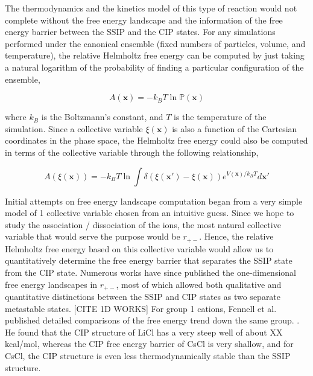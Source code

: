\begin{spacing}{2.0}
    The thermodynamics and the kinetics model of this type of reaction would not complete without the free energy landscape and the information 
    of the free energy barrier between the SSIP and the CIP states. For any simulations performed under the canonical ensemble (fixed numbers of 
    particles, volume, and temperature), the relative Helmholtz free energy can be computed by just taking a natural logarithm of the probability 
    of finding a particular configuration of the ensemble,

    \begin{equation}
        A(\mathbf{x}) = -k_B T \ln\mathbb{P}(\mathbf{x})
    \end{equation}

    \noindent where $k_B$ is the Boltzmann's constant, and $T$ is the temperature of the simulation. Since a collective variable $\xi(\mathbf{x})$
    is also a function of the Cartesian coordinates in the phase space, the Helmholtz free energy could also be computed in terms of the collective
    variable through the following relationship,

    \begin{equation}
        A\left(\xi(\mathbf{x})\right) = -k_B T \ln\int\delta\left(\xi(\mathbf{x}') - \xi(\mathbf{x})\right)e^{V(\mathbf{x})/k_B T} d\mathbf{x}'
    \end{equation}

    Initial attempts on free energy landscape computation began from a very simple model of 1 collective variable chosen from an intuitive guess. 
    Since we hope to study the association / dissociation of the ions, the most natural collective variable that would serve the purpose would be 
    $r_{+-}$. Hence, the relative Helmholtz free energy based on this collective variable would allow us to quantitatively determine the free 
    energy barrier that separates the SSIP state from the CIP state. Numerous works have since published the one-dimensional free energy landscapes 
    in $r_{+-}$, most of which allowed both qualitative and quantitative distinctions between the SSIP and CIP states as two separate metastable 
    states. [CITE 1D WORKS] For group 1 cations, Fennell et al. published detailed comparisons of the free energy trend down the same group. 
    \cite{P-JPhysChemB-2009-v113}. He found that the CIP structure of LiCl has a very steep well of about XX kcal/mol, whereas the CIP free energy 
    barrier of CsCl is very shallow, and for CsCl, the CIP structure is even less thermodynamically stable than the SSIP structure. 


\end{spacing}
